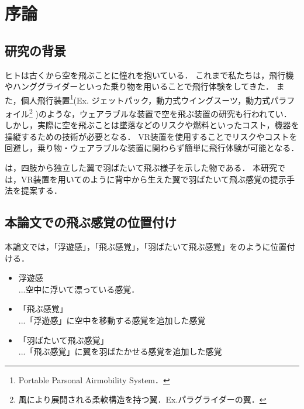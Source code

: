 \chapter[序論]%
        {序論}
\section{研究の背景}


        ヒトは古くから空を飛ぶことに憧れを抱いている．
        これまで私たちは，飛行機やハンググライダーといった乗り物を用いることで飛行体験をしてきた．
        また，個人飛行装置\footnote{Portable Parsonal Airmobility System．}(Ex. ジェットパック，動力式ウイングスーツ，動力式パラフォイル\footnote{風により展開される柔軟構造を持つ翼．Ex.パラグライダーの翼．}
        )のような，ウェアラブルな装置で空を飛ぶ装置の研究も行われてい\cite{gravityindustries}．
        しかし，実際に空を飛ぶことは墜落などのリスクや燃料といったコスト，機器を操縦するための技術が必要となる．
        VR装置を使用することでリスクやコストを回避し，乗り物・ウェアラブルな装置に関わらず簡単に飛行体験が可能となる．

        は，四肢から独立した翼で羽ばたいて飛ぶ様子を示した物である．
        本研究では，VR装置を用いてのように背中から生えた翼で羽ばたいて飛ぶ感覚の提示手法を提案する．

\section{本論文での飛ぶ感覚の位置付け}
        本論文では，「浮遊感」，「飛ぶ感覚」，「羽ばたいて飛ぶ感覚」をのように位置付ける．

        \begin{itemize}
                \item 浮遊感\\
                ...空中に浮いて漂っている感覚．
                \item 「飛ぶ感覚」\\
                ...「浮遊感」に空中を移動する感覚を追加した感覚
                \item 「羽ばたいて飛ぶ感覚」\\
                ...「飛ぶ感覚」に翼を羽ばたかせる感覚を追加した感覚
        \end{itemize}

